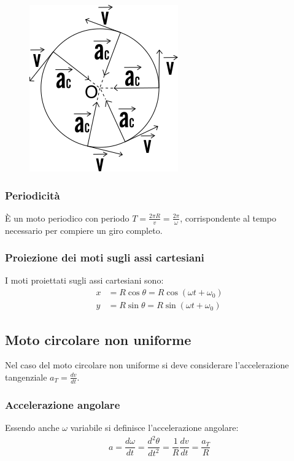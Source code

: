 \documentclass[class=book, crop=false, oneside, 12pt]{standalone}
\begin{document}
  \begin{figure}[h]
    \includegraphics[scale=0.4]{moto-circolare-uniforme}
    \centering
    \caption{}
  \end{figure}

    \subsubsection{Periodicit\`a}
    È un moto periodico con periodo \(T = \frac{2 \pi R}{v} = \frac{2 \pi}{\omega}\), corrispondente al tempo necessario per compiere un giro completo.
    \subsubsection{Proiezione dei moti sugli assi cartesiani}
    I moti proiettati sugli assi cartesiani sono:
    \begin{align}
      x&= R \cos \theta = R \cos (\omega t + \omega_0) \\
      y&= R \sin \theta = R \sin (\omega t + \omega_0)
    \end{align}
	\subsection{Moto circolare non uniforme}
	Nel caso del moto circolare non uniforme si deve considerare l'accelerazione tangenziale $a_T=\frac{dv}{dt}$.
		\subsubsection{Accelerazione angolare}
		Essendo anche $\omega$ variabile si definisce l'accelerazione angolare:
		\begin{align*}
			a=\dfrac{d\omega}{dt}=\dfrac{d^2\theta}{dt^2}=\dfrac{1}{R}\dfrac{dv}{dt}=\dfrac{a_T}{R}
		\end{align*}
\end{document}
